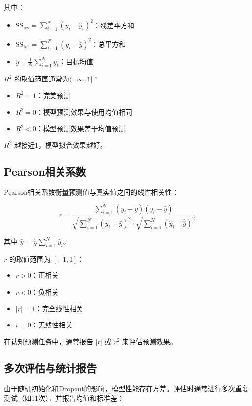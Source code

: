 其中：
\begin{itemize}
    \item $\text{SS}_{\text{res}} = \sum_{i=1}^{N} (y_i - \hat{y}_i)^2$：残差平方和
    \item $\text{SS}_{\text{tot}} = \sum_{i=1}^{N} (y_i - \bar{y})^2$：总平方和
    \item $\bar{y} = \frac{1}{N} \sum_{i=1}^{N} y_i$：目标均值
\end{itemize}

$R^2$ 的取值范围通常为$(-\infty, 1]$：
\begin{itemize}
    \item $R^2 = 1$：完美预测
    \item $R^2 = 0$：模型预测效果与使用均值相同
    \item $R^2 < 0$：模型预测效果差于均值预测
\end{itemize}

$R^2$ 越接近1，模型拟合效果越好。

\subsection{Pearson相关系数}

Pearson相关系数衡量预测值与真实值之间的线性相关性：

\begin{equation}
r = \frac{\sum_{i=1}^{N} (y_i - \bar{y})(\hat{y}_i - \overline{\hat{y}})}{\sqrt{\sum_{i=1}^{N} (y_i - \bar{y})^2} \cdot \sqrt{\sum_{i=1}^{N} (\hat{y}_i - \overline{\hat{y}})^2}}
\end{equation}

其中 $\overline{\hat{y}} = \frac{1}{N} \sum_{i=1}^{N} \hat{y}_i$。

$r$ 的取值范围为 $[-1, 1]$：
\begin{itemize}
    \item $r > 0$：正相关
    \item $r < 0$：负相关
    \item $|r| = 1$：完全线性相关
    \item $r = 0$：无线性相关
\end{itemize}

在认知预测任务中，通常报告 $|r|$ 或 $r^2$ 来评估预测效果。

\subsection{多次评估与统计报告}

由于随机初始化和Dropout的影响，模型性能存在方差。评估时通常进行多次重复测试（如11次），并报告均值和标准差：

